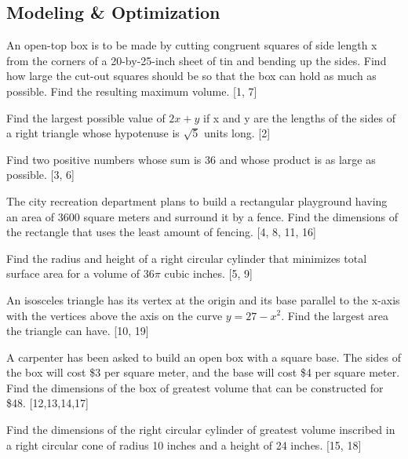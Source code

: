 \documentclass[addpoints, 12pt]{exam}
\begin{document}
\newpage
{}
\subsection*{Modeling \& Optimization}
\begin{questions}
    \question An open-top box is to be made by cutting congruent squares of side length x from the corners of a 20-by-25-inch sheet of tin and bending up the sides.  Find how large the cut-out squares should be so that the box can hold as much as possible.  Find the resulting maximum volume. [1, 7]
    
    
    \question Find the largest possible value of $2x+y$  if x and y are the lengths of the sides of a right triangle whose hypotenuse is $\sqrt{5}$ units long. [2]
    
    
    \newpage
    
    \question Find two positive numbers whose sum is 36 and whose product is as large as possible. [3, 6]

    \question The city recreation department plans to build a rectangular playground having an area of 3600 square meters and surround it by a fence.  Find the dimensions of the rectangle that uses the least amount of fencing.  [4, 8, 11, 16]

    \question Find the radius and height of a right circular cylinder that minimizes total surface area for a volume of $36\pi$ cubic inches.  [5, 9]
    
    \newpage
    
    \question An isosceles triangle has its vertex at the origin and its base parallel to the x-axis with the vertices above the axis on the curve $y=27-x^2$. Find the largest area the triangle can have. [10, 19]
    
    \question A carpenter has been asked to build an open box with a square base.  The sides of the box will cost \$3 per square meter, and the base will cost \$4 per square meter.  Find the dimensions of the box of greatest volume that can be constructed for \$48.  [12,13,14,17]
    
    \question Find the dimensions of the right circular cylinder of greatest volume inscribed in a right circular cone of radius 10 inches and a height of 24 inches.  [15, 18]
    
    
\end{questions}
\end{document}
